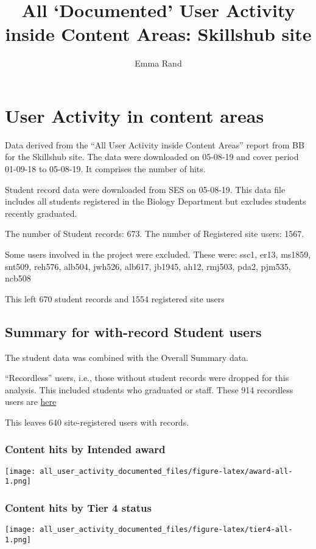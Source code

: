 \documentclass[]{article}
\title{All `Documented' User Activity inside Content Areas: Skillshub site}
\author{Emma Rand}
\date{}
\begin{document}
\maketitle

{
\setcounter{tocdepth}{2}
\tableofcontents
}
\hypertarget{user-activity-in-content-areas}{%
\section{User Activity in content areas}\label{user-activity-in-content-areas}}

Data derived from the ``All User Activity inside Content Areas'' report from BB for the Skillshub site.
The data were downloaded on 05-08-19 and cover period 01-09-18 to 05-08-19. It comprises the number of hits.

Student record data were downloaded from SES on 05-08-19. This data file includes all students registered in the Biology Department but excludes students recently graduated.

The number of Student records: 673.
The number of Registered site users: 1567.

Some users involved in the project were excluded. These were: ssc1, er13, ms1859, snt509, reh576, alb504, jwh526, alb617, jb1945, ah12, rmj503, pda2, pjm535, ncb508

This left 670 student records and 1554 registered site users

\hypertarget{summary-for-with-record-student-users}{%
\subsection{Summary for with-record Student users}\label{summary-for-with-record-student-users}}

The student data was combined with the Overall Summary data.

``Recordless'' users, i.e., those without student records were dropped for this analysis. This included students who graduated or staff. These 914 recordless users are \href{../data/recordless.txt}{here}

This leaves 640 site-registered users with records.

\hypertarget{content-hits-by-intended-award}{%
\subsubsection{Content hits by Intended award}\label{content-hits-by-intended-award}}

\texttt{[image: all\_user\_activity\_documented\_files/figure-latex/award-all-1.png]}

\hypertarget{content-hits-by-tier-4-status}{%
\subsubsection{Content hits by Tier 4 status}\label{content-hits-by-tier-4-status}}

\texttt{[image: all\_user\_activity\_documented\_files/figure-latex/tier4-all-1.png]}
\end{document}
